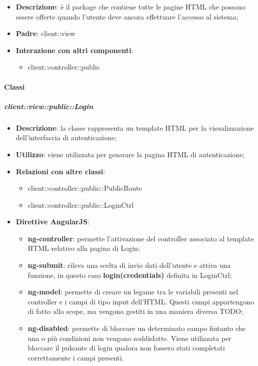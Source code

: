 \begin{itemize}
	\item \textbf{Descrizione}: è il package che contiene tutte le pagine HTML che possono essere offerte quando l'utente deve ancora effettuare l'accesso al sistema;
	\item \textbf{Padre}: client::view
	\item \textbf{Interazione con altri componenti}:
		\begin{itemize}
			\item client::controller::public
		\end{itemize}
\end{itemize}

	\paragraph{Classi} %
		\subparagraph{client::view::public::Login} %
		\label{subp:bdsm_app_client_view_public_login}

			\begin{itemize}
				\item \textbf{Descrizione}: la classe rappresenta un template HTML per la visualizzazione dell'interfaccia di autenticazione;
				\item \textbf{Utilizzo}: viene utilizzata per generare la pagina HTML di autenticazione;
				\item \textbf{Relazioni con altre classi}:
					\begin{itemize}
						\item client::controller::public::PublicRoute
						\item client::controller::public::LoginCtrl
					\end{itemize}
				\item \textbf{Direttive AngularJS}:
					\begin{itemize}
						\item \textbf{ng-controller}: permette l'attivazione del controller associato al template HTML relativo alla pagina di Login;
						\item \textbf{ng-submit}: rileva una scelta di invio dati dell'utente e attiva una funzione, in questo caso \textbf{login(credentials)} definita in LoginCtrl;
						\item \textbf{ng-model}: permette di creare un legame tra le variabili presenti nel controller e i campi di tipo input dell'HTML. Questi campi appartengono di fatto allo scope, ma vengono gestiti in una maniera diversa TODO;
						\item \textbf{ng-disabled}: permette di bloccare un determinato campo fintanto che una o più condizioni non vengono soddisfatte. Viene utilizzata per bloccare il pulsante di login qualora non fossero stati completati correttamente i campi presenti.
					\end{itemize}
			\end{itemize}

